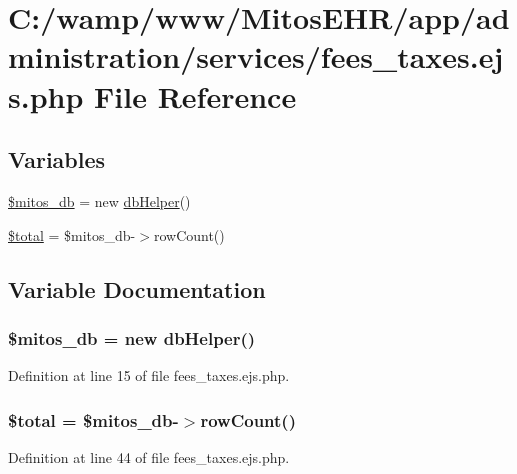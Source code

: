 \hypertarget{fees__taxes_8ejs_8php}{\section{\-C\-:/wamp/www/\-Mitos\-E\-H\-R/app/administration/services/fees\-\_\-taxes.ejs.\-php \-File \-Reference}
\label{fees__taxes_8ejs_8php}
}
\subsection*{\-Variables}
\begin{DoxyCompactItemize}
\item 
\hyperlink{fees__taxes_8ejs_8php_ab5d961f93efe4e2e8d8374f01dd6c65a}{\$mitos\-\_\-db} = new \hyperlink{classdb_helper}{db\-Helper}()
\item 
\hyperlink{fees__taxes_8ejs_8php_a241b818f48030b628685b2e5119c5624}{\$total} = \$mitos\-\_\-db-\/$>$row\-Count()
\end{DoxyCompactItemize}


\subsection{\-Variable \-Documentation}
\hypertarget{fees__taxes_8ejs_8php_ab5d961f93efe4e2e8d8374f01dd6c65a}{
\subsubsection[{\$mitos\-\_\-db}]{\setlength{\rightskip}{0pt plus 5cm}\$mitos\-\_\-db = new {\bf db\-Helper}()}}\label{fees__taxes_8ejs_8php_ab5d961f93efe4e2e8d8374f01dd6c65a}


\-Definition at line 15 of file fees\-\_\-taxes.\-ejs.\-php.

\hypertarget{fees__taxes_8ejs_8php_a241b818f48030b628685b2e5119c5624}{
\subsubsection[{\$total}]{\setlength{\rightskip}{0pt plus 5cm}\$total = \$mitos\-\_\-db-\/$>$row\-Count()}}\label{fees__taxes_8ejs_8php_a241b818f48030b628685b2e5119c5624}


\-Definition at line 44 of file fees\-\_\-taxes.\-ejs.\-php.

